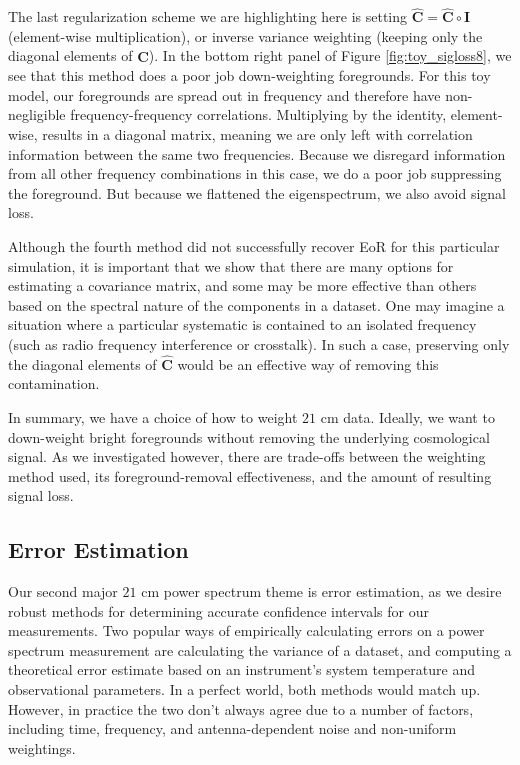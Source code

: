 \documentclass[preprint2,numberedappendix,tighten]{aastex6}  %
\begin{document}
The last regularization scheme we are highlighting here is setting $\hat{\textbf{C}} = \hat{\textbf{C}} \circ \textbf{I}$ (element-wise multiplication), or inverse variance weighting (keeping only the diagonal elements of $\hat{\textbf{C}}$). In the bottom right panel of Figure \ref{fig:toy_sigloss8}, we see that this method does a poor job down-weighting foregrounds. For this toy model, our foregrounds are spread out in frequency and therefore have non-negligible frequency-frequency correlations. Multiplying by the identity, element-wise, results in a diagonal matrix, meaning we are only left with correlation information between the same two frequencies. Because we disregard information from all other frequency combinations in this case, we do a poor job suppressing the foreground. But because we flattened the eigenspectrum, we also avoid signal loss. 

Although the fourth method did not successfully recover EoR for this particular simulation, it is important that we show that there are many options for estimating a covariance matrix, and some may be more effective than others based on the spectral nature of the components in a dataset. One may imagine a situation where a particular systematic is contained to an isolated frequency (such as radio frequency interference or crosstalk). In such a case, preserving only the diagonal elements of $\hat{\textbf{C}}$ would be an effective way of removing this contamination. 

In summary, we have a choice of how to weight $21$ cm data. Ideally, we want to down-weight bright foregrounds without removing the underlying cosmological signal. As we investigated however, there are trade-offs between the weighting method used, its foreground-removal effectiveness, and the amount of resulting signal loss. 


\subsection{Error Estimation}
\label{sec:ErrorOverview}

Our second major $21$ cm power spectrum theme is error estimation, as we desire robust methods for determining accurate confidence intervals for our measurements. Two popular ways of empirically calculating errors on a power spectrum measurement are calculating the variance of a dataset, and computing a theoretical error estimate based on an instrument's system temperature and observational parameters. In a perfect world, both methods would match up. However, in practice the two don't always agree due to a number of factors, including time, frequency, and antenna-dependent noise and non-uniform weightings. 
\end{document}
